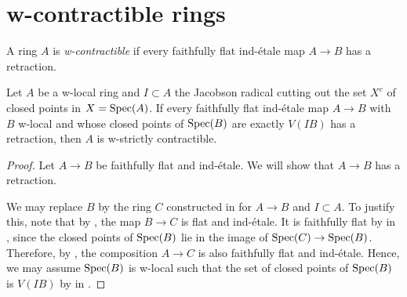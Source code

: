 \section{w-contractible rings}

\begin{definition}
A ring \(A\) is \emph{w-contractible} if every faithfully flat ind-étale map \(A \to B\) has a retraction.
  \label{def:w-contractible-ring}
\end{definition}

\begin{lemma}
  \label{thm:w-contractible-if-ind-etale-plus-c-has-retraction}
  Let \(A\) be a w-local ring and $I \subset A$ the Jacobson radical cutting out the set $X^c$ of closed points in $X = \operatorname{Spec} (A)$. If every faithfully flat ind-étale map \(A \to B\) with \(B\) w-local and whose closed points of \(\operatorname{Spec} (B)\) are exactly \(V(IB)\) has a retraction, then \(A\) is w-strictly contractible.
\end{lemma}

\begin{proof}
  Let $A \to B$ be faithfully flat and ind-étale. 
  We will show that $A \to B$ has a retraction.

  We may replace $B$ by the ring $C$ constructed in  for $A \to B$ and $I \subset A$. To justify this, note that by , the map \( B \to C \) is flat and ind-étale. It is faithfully flat by  in , since the closed points of \( \operatorname{Spec}(B) \) lie in the image of \( \operatorname{Spec}(C) \to \operatorname{Spec}(B) \). Therefore, by , the composition \( A \to C \) is also faithfully flat and ind-étale. Hence, we may assume $\operatorname{Spec} (B)$ is w-local such that the set of closed points of $\operatorname{Spec} (B)$ is $V(IB)$ by  in .
\end{proof}

